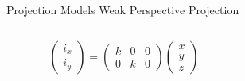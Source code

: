 \begin{frame}[t]{Projection Models}
	Weak Perspective Projection
	\begin{columns}[c, onlytextwidth]
		\begin{column}{0.5\textwidth}
			\vspace{1.5cm}
			$$\left(\begin{array}{c}i_x\\i_y\end{array}\right) = \left(\begin{array}{ccc}k &0 &0\\ 0&k&0\end{array}\right) \left(\begin{array}{c}x\\y\\z\end{array}\right)$$
			\vspace{1.5cm}
		\end{column}\begin{column}{0.5\textwidth}
			\begin{figure}
				\begin{center}
				\end{center}
			\end{figure}



\end{column}
\end{columns}
\end{frame}
